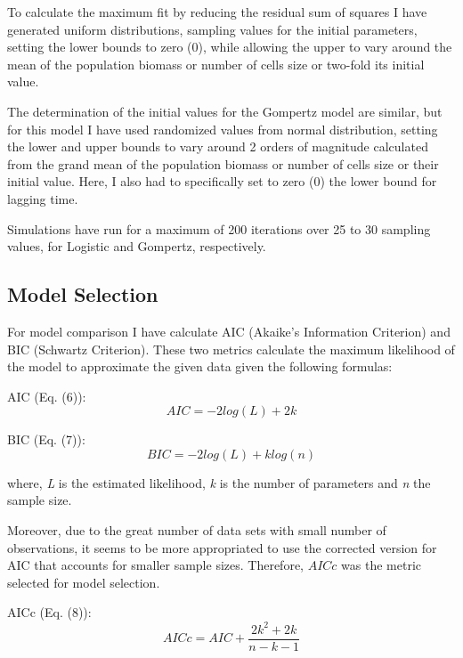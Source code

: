 \documentclass[11]{article}
\begin{document}
To calculate the maximum fit by reducing the residual sum of squares I have generated uniform distributions, sampling values for the initial parameters, setting the lower bounds to zero (0), while allowing the upper to vary around the mean of the population biomass or number of cells size or two-fold its initial value.

The determination of the initial values for the Gompertz model are similar, but for this model I have used randomized values from normal distribution, setting the lower and upper bounds to vary around 2 orders of magnitude calculated from the grand mean of the population biomass or number of cells size or their initial value. Here, I also had to specifically set to zero (0) the lower bound for lagging time.

Simulations have run for a maximum of 200 iterations over 25 to 30 sampling values, for Logistic and Gompertz, respectively.


\subsection{Model Selection}

For model comparison I have calculate AIC (Akaike's Information Criterion) and BIC (Schwartz Criterion). These two metrics calculate the maximum likelihood of the model to approximate the given data given the following formulas:
\newline

AIC (Eq. (6)):
\begin{equation}
    AIC = -2log(L) + 2k
\end{equation}


BIC (Eq. (7)):
\begin{equation}
    BIC = -2log(L) + klog(n)
\end{equation}

where, \emph{L} is the estimated likelihood, \emph{k} is the number of parameters and \emph{n} the sample size.

Moreover, due to the great number of data sets with small number of observations, it seems to be more appropriated to use the corrected version for AIC that accounts for smaller sample sizes. Therefore, $AICc$ was the metric selected for model selection.
\newline

AICc (Eq. (8)):
\begin{equation}
    AICc = AIC + \frac{2k^2+2k}{n - k - 1}
\end{equation}
\end{document}
